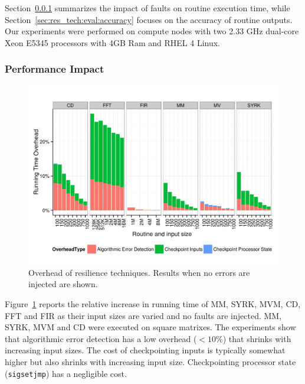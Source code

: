 \documentclass[10pt, conference, compsocconf]{IEEEtran}
\begin{document}
Section~\ref{sec:res_tech:eval:perf} summarizes the impact of faults on routine execution time, while Section~\ref{sec:res_tech:eval:accuracy} focuses on the accuracy of routine outputs.
Our experiments were performed on compute nodes with two 2.33 GHz dual-core Xeon E5345 processors with 4GB Ram and RHEL 4 Linux.

\subsubsection{Performance Impact}
\label{sec:res_tech:eval:perf}

\begin{figure}[ht!]
\centering
\includegraphics[width=1.00\columnwidth]{figs/4_1_1_Overall_Breakdown.png}
\caption{Overhead of resilience techniques. Results when no errors are injected are shown.}
\label{fig:routine_all_ovhd}
\end{figure}

Figure~\ref{fig:routine_all_ovhd} reports the relative increase in running time of MM, SYRK, MVM, CD, FFT and FIR as their input sizes are varied and no faults are injected.
MM, SYRK, MVM and CD were executed on square matrixes.
The experiments show that algorithmic error detection has a low overhead ($<10\%$) that shrinks with increasing input sizes.
The cost of checkpointing inputs is typically somewhat higher but also shrinks with increasing input size.
Checkpointing processor state (\texttt{sigsetjmp}) has a negligible cost.
\end{document}

